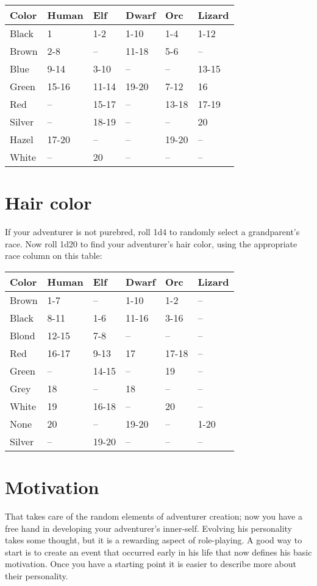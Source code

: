 \begin{normbox}
\small
\begin{tabular}{@{}l l l l l l}
\textbf{Color} & \textbf{Human} & \textbf{Elf} & \textbf{Dwarf} & \textbf{Orc} & \textbf{Lizard}\\
\midrule
Black & 1 & 1-2 & 1-10 & 1-4 & 1-12\\
Brown & 2-8 & -- & 11-18 & 5-6 & --\\
Blue & 9-14 & 3-10 & -- & -- & 13-15\\
Green & 15-16 & 11-14 & 19-20 & 7-12 & 16\\
Red & -- & 15-17 & -- & 13-18 & 17-19\\
Silver & -- & 18-19 & -- & -- & 20\\
Hazel & 17-20 & -- & -- & 19-20 & --\\
White & -- & 20 & -- & -- & --
\end{tabular}
\end{normbox}
\section{Hair color}


If your adventurer is not purebred, roll 1d4 to randomly select a grandparent's race. Now roll 1d20 to find your adventurer's hair color, using the appropriate race column on this table:

\begin{normbox}
\small
\begin{tabular}{@{}l l l l l l}
\textbf{Color} & \textbf{Human} & \textbf{Elf} & \textbf{Dwarf} & \textbf{Orc} & \textbf{Lizard}\\
\midrule

Brown & 1-7 & -- & 1-10 & 1-2 & --\\
Black & 8-11 & 1-6 & 11-16 & 3-16 & --\\
Blond & 12-15 & 7-8 & -- & -- & --\\
Red & 16-17 & 9-13 & 17 & 17-18 & --\\
Green & -- & 14-15 & -- & 19 & --\\
Grey & 18 & -- & 18 & -- & --\\
White & 19 & 16-18 & -- & 20 & --\\
None & 20 & -- & 19-20 & -- & 1-20\\
Silver & -- & 19-20 & -- & -- & --
\end{tabular}
\end{normbox}
\section{Motivation}
That takes care of the random elements of adventurer creation; now you have a free hand in developing your adventurer's inner-self. Evolving his personality takes some thought, but it is a rewarding aspect of role-playing. A good way to start is to create an event that occurred early in his life that now defines his basic motivation. Once you have a starting point it is easier to describe more about their personality.

